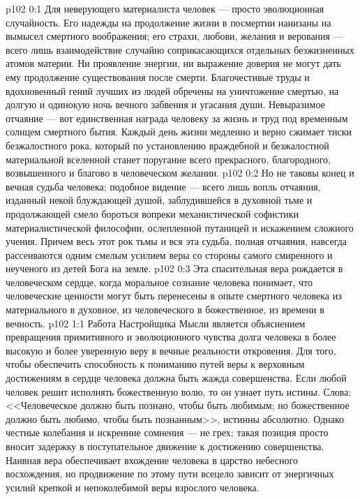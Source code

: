 \vs p102 0:1 Для неверующего материалиста человек --- просто эволюционная случайность. Его надежды на продолжение жизни в посмертии нанизаны на вымысел смертного воображения; его страхи, любови, желания и верования --- всего лишь взаимодействие случайно соприкасающихся отдельных безжизненных атомов материи. Ни проявление энергии, ни выражение доверия не могут дать ему продолжение существования после смерти. Благочестивые труды и вдохновенный гений лучших из людей обречены на уничтожение смертью, на долгую и одинокую ночь вечного забвения и угасания души. Невыразимое отчаяние --- вот единственная награда человеку за жизнь и труд под временным солнцем смертного бытия. Каждый день жизни медленно и верно сжимает тиски безжалостного рока, который по установлению враждебной и безжалостной материальной вселенной станет поругание всего прекрасного, благородного, возвышенного и благово в человеческом желании.
\vs p102 0:2 Но не таковы конец и вечная судьба человека; подобное видение --- всего лишь вопль отчаяния, изданный некой блуждающей душой, заблудившейся в духовной тьме и продолжающей смело бороться вопреки механистической софистики материалистической философии, ослепленной путаницей и искажением сложного учения. Причем весь этот рок тьмы и вся эта судьба, полная отчаяния, навсегда рассеиваются одним смелым усилием веры со стороны самого смиренного и неученого из детей Бога на земле.
\vs p102 0:3 Эта спасительная вера рождается в человеческом сердце, когда моральное сознание человека понимает, что человеческие ценности могут быть перенесены в опыте смертного человека из материального в духовное, из человеческого в божественное, из времени в вечность.
\vs p102 1:1 Работа Настройщика Мысли является объяснением превращения примитивного и эволюционного чувства долга человека в более высокую и более уверенную веру в вечные реальности откровения. Для того, чтобы обеспечить способность к пониманию путей веры к верховным достижениям в сердце человека должна быть жажда совершенства. Если любой человек решит исполнять божественную волю, то он узнает путь истины. Слова: <<Человеческое должно быть познано, чтобы быть любимым; но божественное должно быть любимо, чтобы быть познанным>>, истинны абсолютно. Однако честные колебания и искренние сомнения --- не грех; такая позиция просто вносит задержку в поступательное движение к достижению совершенства. Наивная вера обеспечивает вхождение человека в царство небесного восхождения, но продвижение по этому пути всецело зависит от энергичных усилий крепкой и непоколебимой веры взрослого человека.
